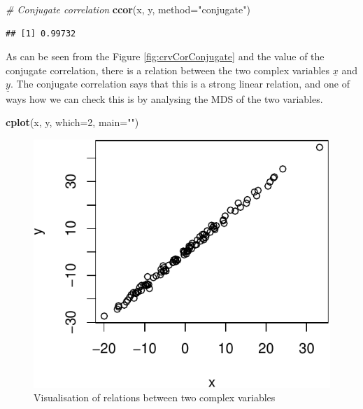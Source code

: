 \documentclass[
]{book}
\newenvironment{Shaded}{\begin{snugshade}}{\end{snugshade}}
\newcommand{\CommentTok}[1]{\textcolor[rgb]{0.56,0.35,0.01}{\textit{#1}}}
\newcommand{\DataTypeTok}[1]{\textcolor[rgb]{0.13,0.29,0.53}{#1}}
\newcommand{\DecValTok}[1]{\textcolor[rgb]{0.00,0.00,0.81}{#1}}
\newcommand{\KeywordTok}[1]{\textcolor[rgb]{0.13,0.29,0.53}{\textbf{#1}}}
\newcommand{\NormalTok}[1]{#1}
\newcommand{\StringTok}[1]{\textcolor[rgb]{0.31,0.60,0.02}{#1}}
\begin{document}
\begin{Shaded}
\begin{Highlighting}[]
\CommentTok{\# Conjugate correlation}
\KeywordTok{ccor}\NormalTok{(x, y, }\DataTypeTok{method=}\StringTok{"conjugate"}\NormalTok{)}
\end{Highlighting}
\end{Shaded}

\begin{verbatim}
## [1] 0.99732
\end{verbatim}

As can be seen from the Figure \ref{fig:crvCorConjugate} and the value of the conjugate correlation, there is a relation between the two complex variables \(\underline{x}\) and \(\underline{y}\). The conjugate correlation says that this is a strong linear relation, and one of ways how we can check this is by analysing the MDS of the two variables.

\begin{Shaded}
\begin{Highlighting}[]
\KeywordTok{cplot}\NormalTok{(x, y, }\DataTypeTok{which=}\DecValTok{2}\NormalTok{, }\DataTypeTok{main=}\StringTok{""}\NormalTok{)}
\end{Highlighting}
\end{Shaded}

\begin{figure}
\centering
\includegraphics{Svetunkov---Svetunkov---Complex-Valued-Econometrics_files/figure-latex/crvCorConjugateMDS-1.pdf}
\caption{\label{fig:crvCorConjugateMDS}Visualisation of relations between two complex variables}
\end{figure}
\end{document}
